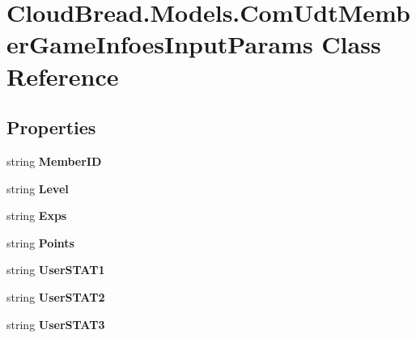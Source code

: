 \hypertarget{a00069}{}\section{Cloud\+Bread.\+Models.\+Com\+Udt\+Member\+Game\+Infoes\+Input\+Params Class Reference}
\label{a00069}
\subsection*{Properties}
\begin{DoxyCompactItemize}
\item 
string {\bfseries Member\+ID}\hypertarget{a00069_a3fb1ebebba4266711c9dfae16601e800}{}\label{a00069_a3fb1ebebba4266711c9dfae16601e800}

\item 
string {\bfseries Level}\hypertarget{a00069_affb807a3ae2fdb2b1a57274dc94b177d}{}\label{a00069_affb807a3ae2fdb2b1a57274dc94b177d}

\item 
string {\bfseries Exps}\hypertarget{a00069_a6a7f01d9b697671a7e860061e296254e}{}\label{a00069_a6a7f01d9b697671a7e860061e296254e}

\item 
string {\bfseries Points}\hypertarget{a00069_a43015a5aa15708e5026341f031486243}{}\label{a00069_a43015a5aa15708e5026341f031486243}

\item 
string {\bfseries User\+S\+T\+A\+T1}\hypertarget{a00069_ada291172540a6f115039c16ec882a5d5}{}\label{a00069_ada291172540a6f115039c16ec882a5d5}

\item 
string {\bfseries User\+S\+T\+A\+T2}\hypertarget{a00069_a32d9aeb1b4c8d78a87258a8c6a34a2c9}{}\label{a00069_a32d9aeb1b4c8d78a87258a8c6a34a2c9}

\item 
string {\bfseries User\+S\+T\+A\+T3}\hypertarget{a00069_a55ea2897d56a3e72f25b3bbbc07b1d9a}{}\label{a00069_a55ea2897d56a3e72f25b3bbbc07b1d9a}


\end{DoxyCompactItemize}
